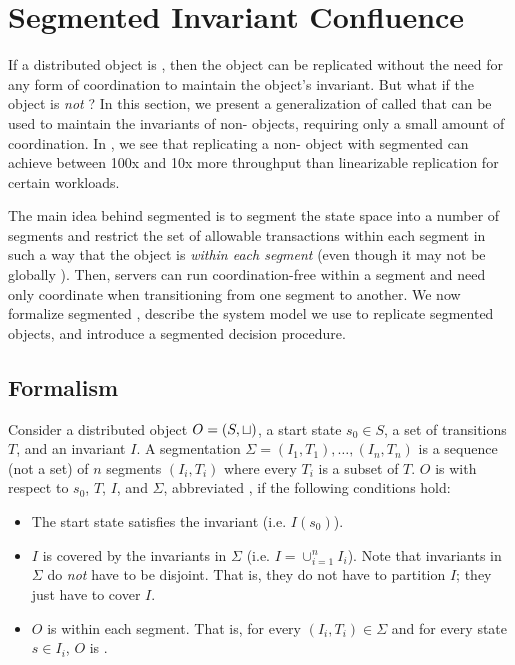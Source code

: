 \section{Segmented Invariant Confluence}
\newcommand{\IsIclosed}{\textsc{IsIclosed}}

If a distributed object is \invariantconfluent{}, then the object can be
replicated without the need for any form of coordination to maintain the
object's invariant. But what if the object is \emph{not} \invariantconfluent{}?
In this section, we present a generalization of \invariantconfluence{} called
 that can be used to maintain the
invariants of non-\invariantconfluent{} objects, requiring only a small amount
of coordination. In , we see that replicating a
non-\invariantconfluent{} object with segmented \invariantconfluence{} can
achieve between 100x and 10x more throughput than linearizable replication for
certain workloads.

The main idea behind segmented \invariantconfluence{} is to segment the state
space into a number of segments and restrict the set of allowable transactions
within each segment in such a way that the object is \invariantconfluent{}
\emph{within each segment} (even though it may not be globally
\invariantconfluent{}). Then, servers can run coordination-free within a
segment and need only coordinate when transitioning from one segment to
another. We now formalize segmented \invariantconfluence{}, describe the system
model we use to replicate segmented \invariantconfluent{} objects, and
introduce a segmented \invariantconfluence{} decision procedure.

\subsection{Formalism}
Consider a distributed object $O = (S, \sqcup)$, a start state $s_0 \in S$, a
set of transitions $T$, and an invariant $I$. A segmentation $\Sigma = (I_1,
T_1), \ldots, (I_n, T_n)$ is a sequence (not a set) of $n$ segments $(I_i,
T_i)$ where every $T_i$ is a subset of $T$. $O$ is  with respect to $s_0$, $T$, $I$, and $\Sigma$,
abbreviated , if the following conditions hold:
\begin{itemize}
  \item
    The start state satisfies the invariant (i.e. $I(s_0)$).

  \item
    $I$ is covered by the invariants in $\Sigma$ (i.e. $I = \cup_{i=1}^n I_i$).
    Note that invariants in $\Sigma$ do \emph{not} have to be disjoint. That
    is, they do not have to partition $I$; they just have to cover $I$.

  \item
    $O$ is \invariantconfluent{} within each segment. That is, for every $(I_i,
    T_i) \in \Sigma$ and for every state $s \in I_i$, $O$ is
    .
\end{itemize}

